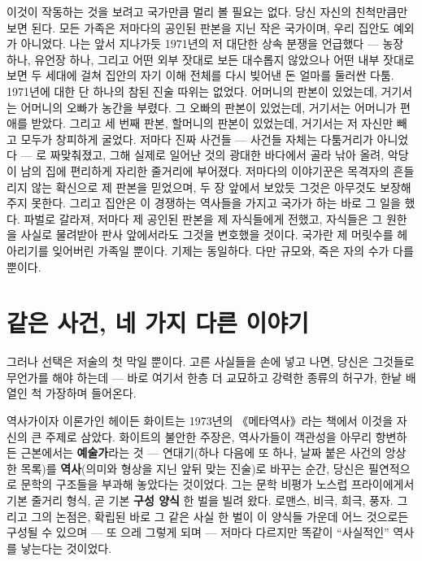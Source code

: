 이것이 작동하는 것을 보려고 국가만큼 멀리 볼 필요는 없다. 당신 자신의 친척만큼만 보면 된다. 모든 가족은 저마다의 공인된 판본을 지닌 작은 국가이며, 우리 집안도 예외가 아니었다. 나는 앞서 지나가듯 1971년의 저 대단한 상속 분쟁을 언급했다 — 농장 하나, 유언장 하나, 그리고 어떤 외부 잣대로 보든 대수롭지 않았으나 어떤 내부 잣대로 보면 두 세대에 걸쳐 집안의 자기 이해 전체를 다시 빚어낸 돈 얼마를 둘러싼 다툼. 1971년에 대한 단 하나의 참된 진술 따위는 없었다. 어머니의 판본이 있었는데, 거기서는 어머니의 오빠가 농간을 부렸다. 그 오빠의 판본이 있었는데, 거기서는 어머니가 편애를 받았다. 그리고 세 번째 판본, 할머니의 판본이 있었는데, 거기서는 저 자신만 빼고 모두가 창피하게 굴었다. 저마다 진짜 사건들 — 사건들 자체는 다툼거리가 아니었다 — 로 짜맞춰졌고, 그해 실제로 일어난 것의 광대한 바다에서 골라 낚아 올려, 악당이 남의 집에 편리하게 자리한 줄거리에 부어졌다. 저마다의 이야기꾼은 목격자의 흔들리지 않는 확신으로 제 판본을 믿었으며, 두 장 앞에서 보았듯 그것은 아무것도 보장해 주지 못한다. 그리고 집안은 이 경쟁하는 역사들을 가지고 국가가 하는 바로 그 일을 했다. 파벌로 갈라져, 저마다 제 공인된 판본을 제 자식들에게 전했고, 자식들은 그 원한을 사실로 물려받아 판사 앞에서라도 그것을 변호했을 것이다. 국가란 제 머릿수를 헤아리기를 잊어버린 가족일 뿐이다. 기제는 동일하다. 다만 규모와, 죽은 자의 수가 다를 뿐이다.

\section*{같은 사건, 네 가지 다른 이야기}

그러나 선택은 저술의 첫 막일 뿐이다. 고른 사실들을 손에 넣고 나면, 당신은 그것들로 무언가를 해야 하는데 — 바로 여기서 한층 더 교묘하고 강력한 종류의 허구가, 한낱 배열인 척 가장하며 들어온다.

역사가이자 이론가인 헤이든 화이트는 1973년의 《메타역사》라는 책에서 이것을 자신의 큰 주제로 삼았다. 화이트의 불안한 주장은, 역사가들이 객관성을 아무리 항변하든 근본에서는 \textbf{예술가}라는 것 — 연대기(하나 다음에 또 하나, 날짜 붙은 사건의 앙상한 목록)를 \textbf{역사}(의미와 형상을 지닌 앞뒤 맞는 진술)로 바꾸는 순간, 당신은 필연적으로 문학의 구조들을 부과해 놓았다는 것이었다. 그는 문학 비평가 노스럽 프라이에게서 기본 줄거리 형식, 곧 기본 \textbf{구성 양식} 한 벌을 빌려 왔다. 로맨스, 비극, 희극, 풍자. 그리고 그의 논점은, 확립된 바로 그 같은 사실 한 벌이 이 양식들 가운데 어느 것으로든 구성될 수 있으며 — 또 으레 그렇게 되며 — 저마다 다르지만 똑같이 ``사실적인'' 역사를 낳는다는 것이었다.

